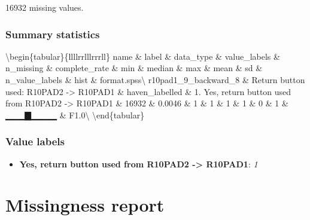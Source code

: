 \documentclass[
]{book}
\providecommand{\tightlist}{%
  \setlength{\itemsep}{0pt}\setlength{\parskip}{0pt}}
\begin{document}
16932 missing values.

\hypertarget{r10pad1_9_backward_8_summary}{%
\subsubsection{Summary statistics}\label{r10pad1_9_backward_8_summary}}

\textbackslash begin\{tabular\}\{l\textbar l\textbar l\textbar l\textbar r\textbar r\textbar l\textbar l\textbar l\textbar r\textbar r\textbar r\textbar l\textbar l\}
\hline
name \& label \& data\_type \& value\_labels \& n\_missing \& complete\_rate \& min \& median \& max \& mean \& sd \& n\_value\_labels \& hist \& format.spss\textbackslash{}
\hline
r10pad1\_9\_backward\_8 \& Return button used: R10PAD2 -\textgreater{} R10PAD1 \& haven\_labelled \& 1. Yes, return button used from R10PAD2 -\textgreater{} R10PAD1 \& 16932 \& 0.0046 \& 1 \& 1 \& 1 \& 1 \& 0 \& 1 \& ▁▁▁▇▁▁▁▁ \& F1.0\textbackslash{}
\hline
\textbackslash end\{tabular\}

\hypertarget{r10pad1_9_backward_8_labels}{%
\subsubsection{Value labels}\label{r10pad1_9_backward_8_labels}}

\begin{itemize}
\tightlist
\item
  \textbf{Yes, return button used from R10PAD2 -\textgreater{} R10PAD1}: \emph{1}
\end{itemize}

\hypertarget{missingness-report-1}{%
\section{Missingness report}\label{missingness-report-1}}
\end{document}
